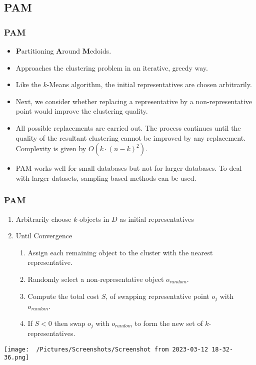 \documentclass{beamer}
\begin{document}
\subsection{PAM}
\begin{frame}
    \frametitle{PAM}
    \begin{itemize}
        \item \textbf Partitioning \textbf Around \textbf Medoids.
        \item Approaches the clustering problem in an iterative, greedy way.
        \item Like the $k$-Means algorithm, the initial representatives are chosen arbitrarily.
        \item Next, we consider whether replacing a representative by a non-representative point would improve the clustering quality.
        \item All possible replacements are carried out. The process continues until  the quality of the resultant clustering cannot be improved by any replacement. Complexity is given by $O(k \cdot (n-k)^2)$.
        \item PAM works well for small databases but not for larger databases. To deal with larger datasets, sampling-based methods can be used.    
    \end{itemize}
\end{frame}

\begin{frame}
    \frametitle{PAM}
    \begin{enumerate}
        \item Arbitrarily choose $k$-objects in $D$ as initial representatives
        \item Until Convergence
        \begin{enumerate}
            \item Assign each remaining object to the cluster with the nearest representative.
            \item Randomly select a non-representative object $o_{random}$.
            \item Compute the total cost $S$, of swapping representative point $o_j$ with $o_{random}$.
            \item If $S < 0$ then swap $o_j$ with $o_{random}$ to form the new set of $k$-representatives.
        \end{enumerate}
    \end{enumerate}
\end{frame}

\begin{frame}
    \centering \texttt{[image: ~/Pictures/Screenshots/Screenshot from 2023-03-12 18-32-36.png]}
\end{frame}
\end{document}
